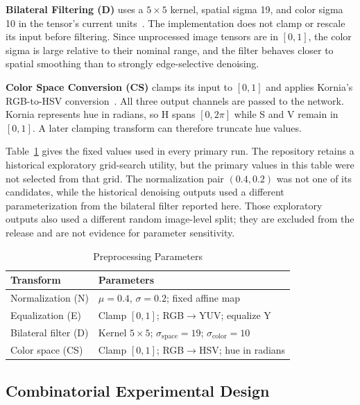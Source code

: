 \documentclass[preprint,review,12pt]{elsarticle}
\begin{document}
\textbf{Bilateral Filtering (D)} uses a $5\times5$ kernel, spatial sigma 19, and color sigma 10 in the tensor's current units~\cite{MAFI2019236, elad2023imagedenoisingdeeplearning}. The implementation does not clamp or rescale its input before filtering. Since unprocessed image tensors are in $[0,1]$, the color sigma is large relative to their nominal range, and the filter behaves closer to spatial smoothing than to strongly edge-selective denoising.

\textbf{Color Space Conversion (CS)} clamps its input to $[0,1]$ and applies Kornia's RGB-to-HSV conversion~\cite{ballester2022influencecolorspacesdeep}. All three output channels are passed to the network. Kornia represents hue in radians, so H spans $[0,2\pi]$ while S and V remain in $[0,1]$. A later clamping transform can therefore truncate hue values.

Table~\ref{tab:params} gives the fixed values used in every primary run. The repository retains a historical exploratory grid-search utility, but the primary values in this table were not selected from that grid. The normalization pair $(0.4,0.2)$ was not one of its candidates, while the historical denoising outputs used a different parameterization from the bilateral filter reported here. Those exploratory outputs also used a different random image-level split; they are excluded from the release and are not evidence for parameter sensitivity.

\begin{table}[!t]
\caption{Preprocessing Parameters\label{tab:params}}
\centering
\begin{tabular}{l l}
\toprule
\textbf{Transform} & \textbf{Parameters} \\
\midrule
Normalization (N) & $\mu=0.4$, $\sigma=0.2$; fixed affine map \\
Equalization (E) & Clamp $[0,1]$; RGB$\to$YUV; equalize Y \\
Bilateral filter (D)  & Kernel $5 \times 5$; $\sigma_{\text{space}}=19$; $\sigma_{\text{color}}=10$ \\
Color space (CS) & Clamp $[0,1]$; RGB$\to$HSV; hue in radians \\
\bottomrule
\end{tabular}
\end{table}

\subsection{Combinatorial Experimental Design}
\end{document}

